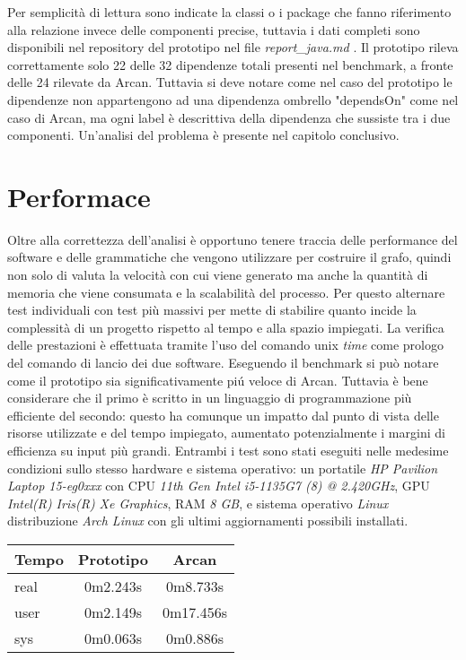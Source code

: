 Per semplicit\`a di lettura sono indicate la classi o i package che fanno riferimento alla relazione invece delle componenti precise, tuttavia i dati completi sono disponibili nel repository del prototipo nel file \emph{report\_java.md} \cite{SkullianRepository}. Il prototipo rileva correttamente solo 22 delle 32 dipendenze totali presenti nel benchmark, a fronte delle 24 rilevate da Arcan. Tuttavia si deve notare come nel caso del prototipo le dipendenze non appartengono ad una dipendenza ombrello "dependsOn" come nel caso di Arcan, ma ogni label \`e descrittiva della dipendenza che sussiste tra i due componenti. Un'analisi del problema \`e presente nel capitolo conclusivo.

\section{Performace}

Oltre alla correttezza dell'analisi \`e opportuno tenere traccia delle performance del software e delle grammatiche che vengono utilizzare per costruire il grafo, quindi non solo di valuta la velocit\`a con cui viene generato ma anche la quantit\`a di memoria che viene consumata e la scalabilit\`a del processo.
Per questo alternare test individuali con test pi\`u massivi per mette di stabilire quanto incide la complessit\`a di un progetto rispetto al tempo e alla spazio impiegati. La verifica delle prestazioni \`e effettuata tramite l'uso del comando unix \emph{time} come prologo del comando di lancio dei due software. Eseguendo il benchmark si pu\`o notare come il prototipo sia significativamente pi\'u veloce di Arcan. Tuttavia \`e bene considerare che il primo \`e scritto in un linguaggio di programmazione pi\`u efficiente del secondo: questo ha comunque un impatto dal punto di vista delle risorse utilizzate e del tempo impiegato, aumentato potenzialmente i margini di efficienza su input pi\`u grandi.
Entrambi i test sono stati eseguiti nelle medesime condizioni sullo stesso hardware e sistema operativo: un portatile \emph{HP Pavilion Laptop 15-eg0xxx} con CPU \emph{11th Gen Intel i5-1135G7 (8) @ 2.420GHz}, GPU \emph{Intel(R) Iris(R) Xe Graphics}, RAM \emph{8 GB}, e sistema operativo \emph{Linux} distribuzione \emph{Arch Linux} con gli ultimi aggiornamenti possibili installati.

\begin{center}
    \begin{tabular}{|l | c | c|}
        \hline
        Tempo & Prototipo & Arcan \\
        \hline
        real & 0m2.243s & 0m8.733s \\
        user & 0m2.149s & 0m17.456s \\
        sys & 0m0.063s & 0m0.886s \\
        \hline
    \end{tabular}
\end{center}

